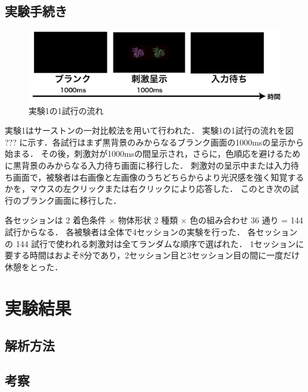     \subsection{実験手続き}

        \begin{figure}[h]
            \centering
            \includegraphics[width=14.0cm]{./img/ex1_procedure.png}
            \caption{実験1の1試行の流れ}
            \label{ex1_procedure}
        \end{figure}

        実験1はサーストンの一対比較法を用いて行われた．
        実験1の1試行の流れを図 ??? に示す．各試行はまず黒背景のみからなるブランク画面の1000msの呈示から始まる．
        その後，刺激対が1000msの間呈示され，さらに，色順応を避けるために黒背景のみからなる入力待ち画面に移行した．
        刺激対の呈示中または入力待ち画面で，被験者は右画像と左画像のうちどちらからより光沢感を強く知覚するかを，マウスの左クリックまたは右クリックにより応答した．
        このとき次の試行のブランク画面に移行した．

        各セッションは 2 着色条件 $\times$ 物体形状 2 種類 $\times$ 色の組み合わせ 36 通り = 144 試行からなる．
        各被験者は全体で4セッションの実験を行った．
        各セッションの 144 試行で使われる刺激対は全てランダムな順序で選ばれた．
        1セッションに要する時間はおよそ8分であり，2セッション目と3セッション目の間に一度だけ休憩をとった．



\section{実験結果}
    \subsection{解析方法}

    \subsection{考察}
        
